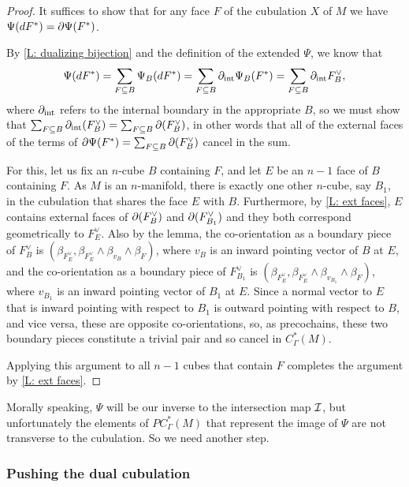 \begin{proof}
	It suffices to show that for any face $F$ of the cubulation $X$ of $M$ we have $\Psi(d F^*) = \partial\Psi(F^*)$.

	By \cref{L: dualizing bijection} and the definition of the extended $\Psi$, we know that
	$$\Psi(dF^*) =  \sum_{F \subseteq B} \Psi_B(dF^*) = \sum_{F \subseteq B}\partial_{\text{int}} \Psi_B(F^*) = \sum_{F \subseteq B} \partial_{\text{int}}F^\vee_B,$$
	where $\partial_{\text{int}}$ refers to the internal boundary in the appropriate $B$, so we must show that $\sum_{F \subseteq B} \partial_{\text{int}}(F^\vee_B) = \sum_{F \subseteq B} \partial (F^\vee_B)$, in other words that all of the external faces of the terms of $\partial\Psi(F^*) = \sum_{F \subseteq B} \partial (F^\vee_B)$ cancel in the sum.

	For this, let us fix an $n$-cube $B$ containing $F$, and let $E$ be an $n-1$ face of $B$ containing $F$.
	As $M$ is an $n$-manifold, there is exactly one other $n$-cube, say $B_1$, in the cubulation that shares the face $E$ with $B$.
	Furthermore, by \cref{L: ext faces}, $E$ contains external faces of $\partial(F^\vee_B)$ and $\partial(F^\vee_{B_1})$ and they both correspond geometrically to $F^\vee_E$.
	Also by the lemma, the co-orientation as a boundary piece of $F^\vee_B$ is $(\beta_{F_E^\vee},\beta_{F_E^\vee} \wedge \beta_{v_B} \wedge \beta_F)$, where $v_B$ is an inward pointing vector of $B$ at $E$, and the co-orientation as a boundary piece of $F^\vee_{B_1}$ is $(\beta_{F_E^\vee},\beta_{F_E^\vee} \wedge \beta_{v_{B_1}} \wedge \beta_F)$, where $v_{B_1}$ is an inward pointing vector of $B_1$ at $E$.
	Since a normal vector to $E$ that is inward pointing with respect to $B_1$ is outward pointing with respect to $B$, and vice versa, these are opposite co-orientations, so, as precochains, these two boundary pieces constitute a trivial pair and so cancel in $C^*_\Gamma(M)$.

	Applying this argument to all $n-1$ cubes that contain $F$ completes the argument by \cref{L: ext faces}.
\end{proof}

Morally speaking, $\Psi$ will be our inverse to the intersection map $\mathcal{I}$, but unfortunately the elements of $PC^*_\Gamma(M)$ that represent the image of $\Psi$ are not transverse to the cubulation.
So we need another step.

\subsubsection{Pushing the dual cubulation}

